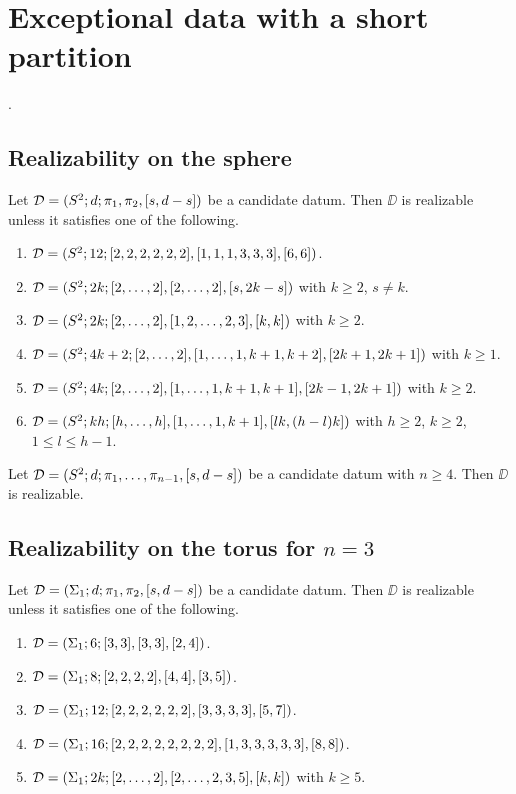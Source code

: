 \chapter{Exceptional data with a short partition}
.

\section{Realizability on the sphere}

\begin{theorem}\label{short-partition:th:realizability-on-sphere-n-3}
Let $\mathcal{D}=(S^2{};d;\pi_1,\pi_2,[s,d-s])$ be a candidate datum. Then $\DD$ is realizable unless it satisfies one of the following.
\begin{enumerate}[(1)]
\item $\mathcal{D}=(S^2{};12;[2,2,2,2,2,2],[1,1,1,3,3,3],[6,6])$.
\item $\mathcal{D}=(S^2{};2k;[2,\ldots,2],[2,\ldots,2],[s,2k-s])$ with $k\ge 2$, $s\neq k$.
\item $\mathcal{D}=(S^2{};2k;[2,\ldots,2],[1,2,\ldots,2,3],[k,k])$ with $k\ge2$.
\item $\mathcal{D}=(S^2{};4k+2;[2,\ldots,2],[1,\ldots,1,k+1,k+2],[2k+1,2k+1])$ with $k\ge 1$.
\item $\mathcal{D}=(S^2{};4k;[2,\ldots,2],[1,\ldots,1,k+1,k+1],[2k-1,2k+1])$ with $k\ge2$.
\item $\mathcal{D}=(S^2{};kh;[h,\ldots,h],[1,\ldots,1,k+1],[lk,(h-l)k])$ with $h\ge 2$, $k\ge 2$, $1\le l\le h-1$.
\end{enumerate}
\end{theorem}

\begin{theorem}\label{short-partition:th:realizability-on-sphere-n-ge-4}
Let $\mathcal{D}=(S^2{};d;\pi_1,\ldots,\pi_{n-1},[s,d-s])$ be a candidate datum with $n\ge 4$. Then $\DD$ is realizable.
\end{theorem}

\section{Realizability on the torus for \texorpdfstring{$n=3$}{n=3}}

\begin{theorem} \label{short-partition:th:realizability-on-torus-n-3}
Let $\mathcal{D}=(\Sigma_{1};d;\pi_1,\pi_2,[s,d-s])$ be a candidate datum. Then $\DD$ is realizable unless it satisfies one of the following.
\begin{enumerate}[(1)]
\item $\mathcal{D}=(\Sigma_{1};6;[3,3],[3,3],[2,4])$.
\item $\mathcal{D}=(\Sigma_{1};8;[2,2,2,2],[4,4],[3,5])$.
\item $\mathcal{D}=(\Sigma_{1};12;[2,2,2,2,2,2],[3,3,3,3],[5,7])$.
\item $\mathcal{D}=(\Sigma_{1};16;[2,2,2,2,2,2,2,2],[1,3,3,3,3,3],[8,8])$.
\item $\mathcal{D}=(\Sigma_{1};2k;[2,\ldots,2],[2,\ldots,2,3,5],[k,k])$ with $k\ge 5$.
\end{enumerate}
\end{theorem}


